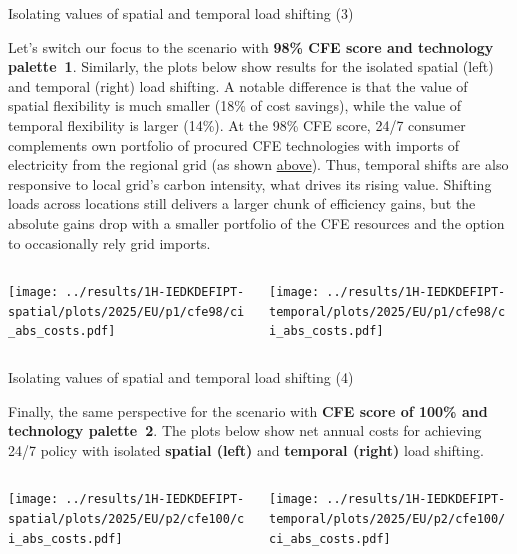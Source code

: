 \begin{frame}{Isolating values of spatial and temporal load shifting (3)}

  {\footnotesize
  \vspace{-0.2cm}
  Let's switch our focus to the scenario with {\bf 98\% CFE score and technology palette~1}. Similarly, the plots below show results for the isolated spatial (left) and temporal (right) load shifting. A notable difference is that the value of spatial flexibility is much smaller (18\% of cost savings), while the value of temporal flexibility is larger (14\%). At the 98\% CFE score, 24/7 consumer complements own portfolio of procured CFE technologies with imports of electricity from the regional grid (as shown \hyperlink{cfe98cost}{above}). Thus, temporal shifts are also \alert{responsive to local grid's carbon intensity}, what drives its rising value. Shifting loads across locations still delivers a larger chunk of efficiency gains, but the absolute gains drop with a smaller portfolio of the CFE resources and the option to occasionally rely grid imports.

  \begin{columns}
    \begin{column}{7cm}
    \texttt{[image: ../results/1H-IEDKDEFIPT-spatial/plots/2025/EU/p1/cfe98/ci\_abs\_costs.pdf]}
    \end{column}
    
    \begin{column}{7cm}
    \texttt{[image: ../results/1H-IEDKDEFIPT-temporal/plots/2025/EU/p1/cfe98/ci\_abs\_costs.pdf]}
    \end{column}
  \end{columns}

  }
  
\end{frame}


\begin{frame}{Isolating values of spatial and temporal load shifting (4)}

  {\footnotesize
  Finally, the same perspective for the scenario with {\bf CFE score of 100\% and technology palette~2}.  The plots below show net annual costs for achieving 24/7 policy with isolated {\bf spatial (left)} and {\bf temporal (right)} load shifting.

  \begin{columns}
    \begin{column}{7cm}
    \texttt{[image: ../results/1H-IEDKDEFIPT-spatial/plots/2025/EU/p2/cfe100/ci\_abs\_costs.pdf]}
    \end{column}
    
    \begin{column}{7cm}
    \texttt{[image: ../results/1H-IEDKDEFIPT-temporal/plots/2025/EU/p2/cfe100/ci\_abs\_costs.pdf]}
    \end{column}
  \end{columns}

  }
  
\end{frame}


